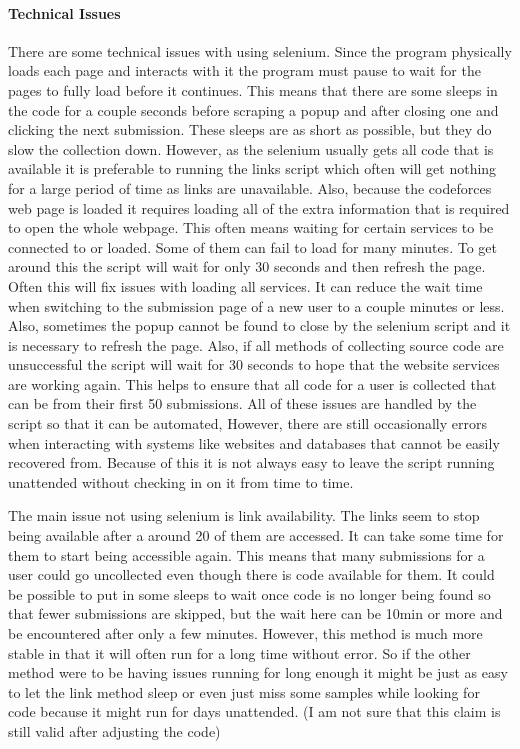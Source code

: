 \documentclass{article}
\begin{document}
\paragraph{Technical Issues}
There are some technical issues with using selenium. Since the program physically loads each page and interacts with it the program must pause to wait for the pages to fully load before it continues. This means that there are some sleeps in the code for a couple seconds before scraping a popup and after closing one and clicking the next submission. These sleeps are as short as possible, but they do slow the collection down. However, as the selenium usually gets all code that is available it is preferable to running the links script which often will get nothing for a large period of time as links are unavailable. Also, because the codeforces web page is loaded it requires loading all of the extra information that is required to open the whole webpage. This often means waiting for certain services to be connected to or loaded. Some of them can fail to load for many minutes. To get around this the script will wait for only 30 seconds and then refresh the page. Often this will fix issues with loading all services. It can reduce the wait time when switching to the submission page of a new user to a couple minutes or less. Also, sometimes the popup cannot be found to close by the selenium script and it is necessary to refresh the page. Also, if all methods of collecting source code are unsuccessful the script will wait for 30 seconds to hope that the website services are working again. This helps to ensure that all code for a user is collected that can be from their first 50 submissions. All of these issues are handled by the script so that it can be automated, However, there are still occasionally errors when interacting with systems like websites and databases that cannot be easily recovered from. Because of this it is not always easy to leave the script running unattended without checking in on it from time to time.

The main issue not using selenium is link availability. The links seem to stop being available after a around 20 of them are accessed. It can take some time for them to start being accessible again. This means that many submissions for a user could go uncollected even though there is code available for them. It could be possible to put in some sleeps to wait once code is no longer being found so that fewer submissions are skipped, but the wait here can be 10min or more and be encountered after only a few minutes. However, this method is much more stable in that it will often run for a long time without error. So if the other method were to be having issues running for long enough it might be just as easy to let the link method sleep or even just miss some samples while looking for code because it might run for days unattended. (I am not sure that this claim is still valid after adjusting the code)
\end{document}
